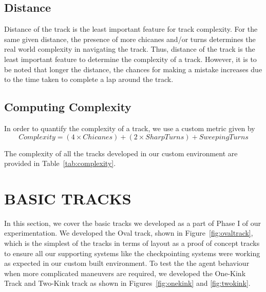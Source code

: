 \subsection{Distance}
Distance of the track is the least important feature for track
complexity. For the same given distance, the presence of more chicanes
and/or turns determines the real world complexity in navigating the
track. Thus, distance of the track is the least important feature to
determine the complexity of a track. However, it is to be noted that
longer the distance, the chances for making a mistake increases due to
the time taken to complete a lap around the track.

\subsection{Computing Complexity}
In order to quantify the complexity of a track, we use a custom metric
given by
\begin{equation}
    Complexity = (4 \times Chicanes) + (2 \times SharpTurns) + SweepingTurns     
\end{equation}

The complexity of all the tracks developed in our custom environment
are provided in Table~\ref{tab:complexity}.

\section{BASIC TRACKS} \label{ch5-basictrack}
%
In this section, we cover the basic tracks we developed as a part of
Phase I of our experimentation. We developed the Oval track, shown in
Figure~\ref{fig:ovaltrack}, which is the simplest of the tracks in
terms of layout as a proof of concept tracks to ensure all our
supporting systems like the checkpointing systems were working as
expected in our custom built environment. To test the the agent
behaviour when more complicated maneuvers are required, we developed
the One-Kink Track and Two-Kink track as shown in
Figures~\ref{fig:onekink} and \ref{fig:twokink}.

